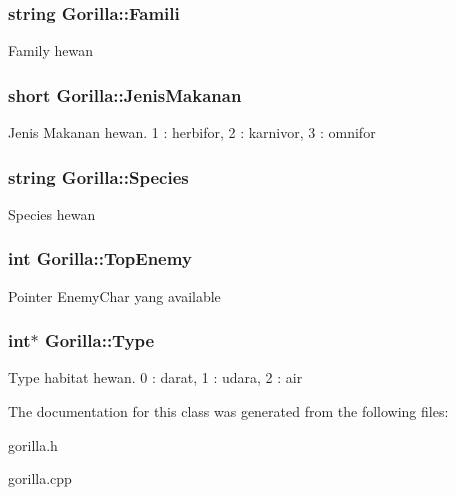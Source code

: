 \subsubsection[{\texorpdfstring{Famili}{Famili}}]{\setlength{\rightskip}{0pt plus 5cm}string Gorilla\+::\+Famili\hspace{0.3cm}{\ttfamily [protected]}}\hypertarget{class_gorilla_aea3d9eec406e69544358197a495418c5}{}\label{class_gorilla_aea3d9eec406e69544358197a495418c5}
Family hewan 
\subsubsection[{\texorpdfstring{Jenis\+Makanan}{JenisMakanan}}]{\setlength{\rightskip}{0pt plus 5cm}short Gorilla\+::\+Jenis\+Makanan\hspace{0.3cm}{\ttfamily [protected]}}\hypertarget{class_gorilla_a288a34cd470a3e8f3f8087cd8db73d86}{}\label{class_gorilla_a288a34cd470a3e8f3f8087cd8db73d86}
Jenis Makanan hewan. 1 \+: herbifor, 2 \+: karnivor, 3 \+: omnifor 
\subsubsection[{\texorpdfstring{Species}{Species}}]{\setlength{\rightskip}{0pt plus 5cm}string Gorilla\+::\+Species\hspace{0.3cm}{\ttfamily [protected]}}\hypertarget{class_gorilla_a90e70ca35f79a05945c2b3d4725d1680}{}\label{class_gorilla_a90e70ca35f79a05945c2b3d4725d1680}
Species hewan 
\subsubsection[{\texorpdfstring{Top\+Enemy}{TopEnemy}}]{\setlength{\rightskip}{0pt plus 5cm}int Gorilla\+::\+Top\+Enemy\hspace{0.3cm}{\ttfamily [protected]}}\hypertarget{class_gorilla_a06bbdc9128f4e07183eae46658feb448}{}\label{class_gorilla_a06bbdc9128f4e07183eae46658feb448}
Pointer Enemy\+Char yang available 
\subsubsection[{\texorpdfstring{Type}{Type}}]{\setlength{\rightskip}{0pt plus 5cm}int$\ast$ Gorilla\+::\+Type\hspace{0.3cm}{\ttfamily [protected]}}\hypertarget{class_gorilla_aa06869dd6e0f6af3e4a8c0575c77dd87}{}\label{class_gorilla_aa06869dd6e0f6af3e4a8c0575c77dd87}
Type habitat hewan. 0 \+: darat, 1 \+: udara, 2 \+: air 

The documentation for this class was generated from the following files\+:\begin{DoxyCompactItemize}
\item 
gorilla.\+h\item 
gorilla.\+cpp\end{DoxyCompactItemize}

